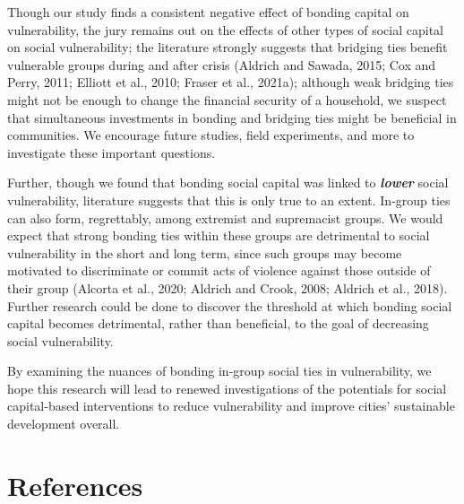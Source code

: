 \documentclass[]{elsarticle} %
\begin{document}
Though our study finds a consistent negative effect of bonding capital
on vulnerability, the jury remains out on the effects of other types of
social capital on social vulnerability; the literature strongly suggests
that bridging ties benefit vulnerable groups during and after crisis
(Aldrich and Sawada, 2015; Cox and Perry, 2011; Elliott et al., 2010;
Fraser et al., 2021a); although weak bridging ties might not be enough
to change the financial security of a household, we suspect that
simultaneous investments in bonding and bridging ties might be
beneficial in communities. We encourage future studies, field
experiments, and more to investigate these important questions.

Further, though we found that bonding social capital was linked to
\textbf{\emph{lower}} social vulnerability, literature suggests that
this is only true to an extent. In-group ties can also form,
regrettably, among extremist and supremacist groups. We would expect
that strong bonding ties within these groups are detrimental to social
vulnerability in the short and long term, since such groups may become
motivated to discriminate or commit acts of violence against those
outside of their group (Alcorta et al., 2020; Aldrich and Crook, 2008;
Aldrich et al., 2018). Further research could be done to discover the
threshold at which bonding social capital becomes detrimental, rather
than beneficial, to the goal of decreasing social vulnerability.

By examining the nuances of bonding in-group social ties in
vulnerability, we hope this research will lead to renewed investigations
of the potentials for social capital-based interventions to reduce
vulnerability and improve cities' sustainable development overall.

\hypertarget{references}{%
\section*{References}\label{references}}
\end{document}
